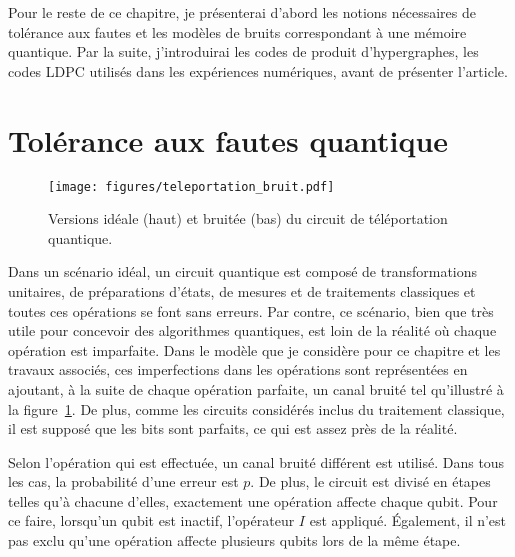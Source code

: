 Pour le reste de ce chapitre,
je présenterai d'abord les notions nécessaires de tolérance aux fautes et les modèles 
de bruits correspondant à une mémoire quantique.
Par la suite,
j'introduirai les codes de produit d'hypergraphes,
les codes LDPC utilisés dans les expériences numériques,
avant de présenter l'article.

\section{Tolérance aux fautes quantique}

\begin{figure}
	\begin{center}
		\texttt{[image: figures/teleportation\_bruit.pdf]}
	\end{center}
	\caption{
		Versions idéale (haut) et bruitée (bas) du circuit de téléportation quantique.
	}
	\label{fig:teleportation_bruit}
\end{figure}

Dans un scénario idéal,
un circuit quantique est composé de transformations unitaires,
de préparations d'états, de mesures et de traitements classiques et toutes ces opérations
se font sans erreurs.
Par contre,
ce scénario,
bien que très utile pour concevoir des algorithmes quantiques,
est loin de la réalité où chaque opération est imparfaite.
Dans le modèle que je considère pour ce chapitre et les travaux associés,
ces imperfections dans les opérations sont représentées en ajoutant,
à la suite de chaque opération parfaite,
un canal bruité tel qu'illustré à la figure~\ref{fig:teleportation_bruit}.
De plus,
comme les circuits considérés inclus du traitement classique,
il est supposé que les bits sont parfaits,
ce qui est assez près de la réalité.

Selon l'opération qui est effectuée,
un canal bruité différent est utilisé.
Dans tous les cas,
la probabilité d'une erreur est $p$.
De plus, 
le circuit est divisé en étapes telles qu'à chacune d'elles,
exactement une opération affecte chaque qubit.
Pour ce faire,
lorsqu'un qubit est inactif,
l'opérateur $I$ est appliqué.
Également,
il n'est pas exclu qu'une opération affecte plusieurs qubits lors de la même étape.

